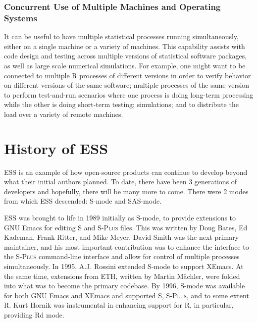 \documentclass{article}
\newcommand*{\Splus}{\textsc{S-Plus}}
\begin{document}
\subsubsection{Concurrent Use of Multiple Machines and Operating
  Systems}
\label{sec:conc-use-mult}

It can be useful to have multiple statistical processes running
simultaneously, either on a single machine or a variety of machines.
This capability assists with code design and testing across multiple
versions of statistical software packages, as well as large scale
numerical simulations.  For example, one might want to be connected to
multiple R processes of different versions in order to verify behavior
on different versions of the same software; multiple processes of the
same version to perform test-and-run scenarios where one process is
doing long-term processing while the other is doing short-term
testing; simulations; and to distribute the load over a variety of
remote machines.

\section{History of ESS}
\label{sec:ESS:history}

ESS is an example of how open-source products can continue to
develop beyond what their initial authors planned.  To date, there have been 3
generations of developers and hopefully, there will be many more to come. 
There were 2 modes from which ESS descended:  S-mode and SAS-mode.

ESS was brought to life in 1989 initially as S-mode, to
provide extensions to GNU Emacs for editing S and \Splus{} files.  This
was written by Doug Bates, Ed Kademan, Frank Ritter, and
Mike Meyer.  David Smith was the next primary maintainer, and his most
important contribution was to enhance the interface to the \Splus{}
command-line interface and allow for control of multiple processes
simultaneously.  In 1995, A.J.  Rossini extended S-mode to support
XEmacs.  At the
same time, extensions from ETH, written by Martin M{\"a}chler, were folded
into what was to become the primary codebase.  By 1996,
S-mode was available for both GNU Emacs and XEmacs and supported S, \Splus, and
to some extent R.  Kurt Hornik was instrumental in enhancing support
for R, in particular, providing Rd mode.
\end{document}
